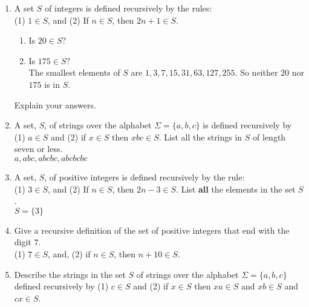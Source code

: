 \documentclass[11pt]{amsart}
\begin{document}
 \begin{enumerate}
 
 \item A set $S$ of integers is defined recursively by the rules: \\[2pt]
 (1) $1\in S$, and (2) If $n\in S$, then
 $2n+1 \in S$. \\[2pt]
 
 \begin{enumerate} 
 \item Is $20\in S$?\\[2pt]
 \item Is $175\in S$?\\[2pt]
 
 {\color{blue} The   smallest elements of $S$ are $1, 3, 7, 15, 31, 63, 127, 255$.
 So neither $20$ nor $175$ is in $S$.\\[5pt]}
 
 \end{enumerate}
 Explain your answers.\\[5pt]
 
 \item A set, $S$, of strings over the alphabet 
$\Sigma = \{a,b,c\}$ is defined recursively by (1) $a \in S$
and (2) if $x\in S$ then $xbc\in S$. List all the strings in $S$ of length seven or less.\\[3pt]

{\color{blue} $a, abc, abcbc, abcbcbc$\\[5pt]}


\item A set, $S$, of positive integers is defined recursively by the rule:\\[2pt]
(1) $3\in S$, and (2) If $n\in S$, then $2n-3\in S$. List {\bfseries all} the elements in the set $S$.\\[3pt]

{\color{blue} $S = \{3\}$\\[5pt]}
 
 \item Give a recursive definition of the set of positive integers that end with the digit $7$.\\[3pt]
 
 {\color{blue} (1) $7\in S$, and, (2) if $n\in S$, then $n+10\in S$.\\[5pt]}

 
\item Describe the strings in the set $S$ of strings over the alphabet 
$\Sigma = \{a,b,c\}$ defined recursively by (1) $ c \in S$
and (2) if $x\in S$ then $xa\in S$ and $xb\in S$ and $cx\in S$.\\[3pt]


\end{enumerate}
\end{document}
